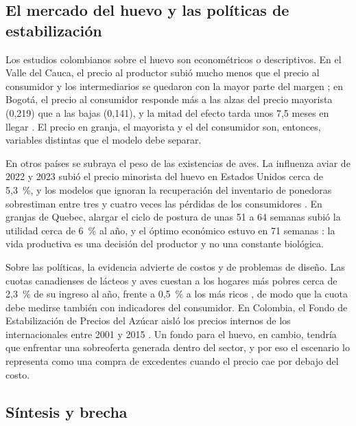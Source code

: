 \documentclass[preprint,12pt,authoryear]{elsarticle}
\begin{document}
\subsection{El mercado del huevo y las políticas de estabilización}
\label{sec2.5}

Los estudios colombianos sobre el huevo son econométricos o descriptivos. En el Valle del Cauca, el precio al productor subió mucho menos que el precio al consumidor y los intermediarios se quedaron con la mayor parte del margen \citep{EcheverrySilva2009}; en Bogotá, el precio al consumidor responde más a las alzas del precio mayorista (0,219) que a las bajas (0,141), y la mitad del efecto tarda unos 7,5 meses en llegar \citep{RodriguezTorres2020}. El precio en granja, el mayorista y el del consumidor son, entonces, variables distintas que el modelo debe separar.

En otros países se subraya el peso de las existencias de aves. La influenza aviar de 2022 y 2023 subió el precio minorista del huevo en Estados Unidos cerca de 5,3~\%, y los modelos que ignoran la recuperación del inventario de ponedoras sobrestiman entre tres y cuatro veces las pérdidas de los consumidores \citep{Mitchell2024}. En granjas de Quebec, alargar el ciclo de postura de unas 51 a 64 semanas subió la utilidad cerca de 6~\% al año, y el óptimo económico estuvo en 71 semanas \citep{TraoreDoyon2023}: la vida productiva es una decisión del productor y no una constante biológica.

Sobre las políticas, la evidencia advierte de costos y de problemas de diseño. Las cuotas canadienses de lácteos y aves cuestan a los hogares más pobres cerca de 2,3~\% de su ingreso al año, frente a 0,5~\% a los más ricos \citep{Cardwell2015}, de modo que la cuota debe medirse también con indicadores del consumidor. En Colombia, el Fondo de Estabilización de Precios del Azúcar aisló los precios internos de los internacionales entre 2001 y 2015 \citep{AlonsoCifuentes2017}. Un fondo para el huevo, en cambio, tendría que enfrentar una sobreoferta generada dentro del sector, y por eso el escenario lo representa como una compra de excedentes cuando el precio cae por debajo del costo.

\subsection{Síntesis y brecha}
\label{sec2.6}
\end{document}
